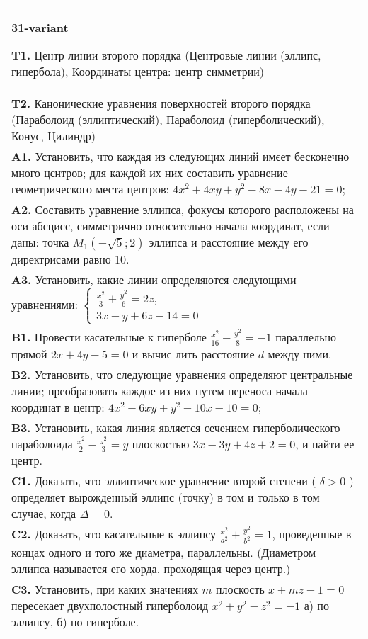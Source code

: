 \documentclass{article}
\begin{document}
\begin{tabular}{m{17cm}}
\textbf{31-variant}
\newline

\textbf{T1.} Центр линии второго порядка (Центровые линии (эллипс, гипербола), Координаты центра: центр симметрии) \\
\textbf{T2.} Канонические уравнения поверхностей второго порядка (Параболоид (эллиптический), Параболоид (гиперболический), Конус, Цилиндр) \\
\textbf{A1.} Установить, что каждая из следующих линий имєет бесконечно много цєнтров; для каждой их них составить уравнение геометрического места центров: $4 x^2+4 x y+y^2-8 x-4 y-21=0$; \\
\textbf{A2.} Составить уравнение эллипса, фокусы которого расположены на оси абсцисс, симметрично относительно начала координат, если даны: точка $M_1(-\sqrt{5} ; 2)$ эллипса и расстояние между его директрисами равно 10. \\
\textbf{A3.} Установить, какие линии определяются следующими уравнениями: $\left\{\begin{array}{l}\frac{x^2}{3}+\frac{y^2}{6}=2 z, \\ 3 x-y+6 z-14=0\end{array}\right.$ \\
\textbf{B1.} Провести касательные к гиперболе $\frac{x^2}{16}-\frac{y^2}{8}=-1$ параллельно прямой $2 x+4 y-5=0$ и вычис лить расстояние $d$ между ними. \\
\textbf{B2.} Установить, что следующие уравнения определяют центральные линии; преобразовать каждое из них путем переноса начала координат в центр: $4 x^2+6 x y+y^2-10 x-10=0$; \\
\textbf{B3.} Установить, какая линия является сечением гиперболического параболоида $\frac{x^2}{2}-\frac{z^2}{3}=y$ плоскостью $3 x-3 y+4 z+2=0$, и найти ее центр. \\
\textbf{C1.} Доказать, что эллиптическое уравнение второй степени ( $\delta>0$ ) определяет вырожденный эллипс (точку) в том и только в том случае, когда $\Delta=0$. \\
\textbf{C2.} Доказать, что касательные к эллипсу $\frac{x^2}{a^2}+\frac{y^2}{b^2}=1$, проведенные в концах одного и того же диаметра, параллельны. (Диаметром эллипса называется его хорда, проходящая через центр.) \\
\textbf{C3.} Установить, при каких значениях $m$ плоскость $x+m z-1=0$ пересекает двухполостный гиперболоид $x^2+y^2-z^2=-1$ а) по эллипсу, б) по гиперболе. \\

\end{tabular}
\vspace{1cm}
\end{document}
